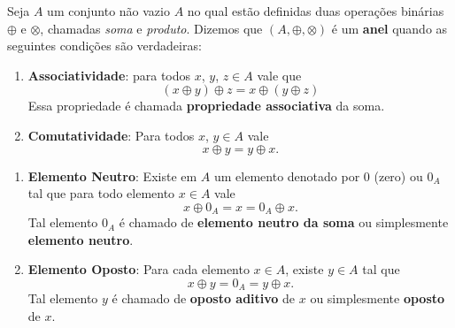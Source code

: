 \documentclass{beamer}
\begin{document}
    \begin{frame}
        \begin{definicao}
            Seja $A$ um conjunto n{\~a}o vazio $A$ no qual est\~ao definidas duas opera{\c c}{\~o}es bin\'arias $\oplus$ e $\otimes$, chamadas \textit{soma} e \textit{produto}.  Dizemos que $(A, \oplus, \otimes)$ {\'e} um \textbf{anel} quando as seguintes condi{\c c}{\~o}es s{\~a}o verdadeiras:
            \begin{enumerate}[label={\roman*})]
                \item \textbf{Associatividade}: para todos $x$, $y$, $z \in A$ vale que
                \[
                    (x \oplus y) \oplus z = x \oplus (y \oplus z)
                \]
                Essa propriedade {\'e} chamada \textbf{propriedade associativa} da soma.

                \vspace{.7cm}

                \item \textbf{Comutatividade}: Para todos $x$, $y \in A$ vale
                \[
                    x \oplus y = y \oplus x.
                \]

                \vspace{.7cm}

                \seti
            \end{enumerate}
        \end{definicao}
    \end{frame}

    \begin{frame}
        \begin{definicao}
            \begin{enumerate}[label={\roman*})]
                \conti

                \item \textbf{Elemento Neutro}: Existe em $A$ um elemento denotado por $0$ (zero) ou $0_{A}$ tal que para todo elemento $x \in A$ vale
                \[
                    x \oplus 0_A = x = 0_A \oplus x.
                \]
                Tal elemento $0_A$ \'e chamado de \textbf{elemento neutro da soma} ou simplesmente \textbf{elemento neutro}.

                \vspace{.7cm}

                \item \textbf{Elemento Oposto}: Para cada elemento $x \in A$, existe $y \in A$ tal que
                \[
                    x \oplus y = 0_A = y \oplus x.
                \]
                Tal elemento $y$ \'e chamado de \textbf{oposto aditivo} de $x$ ou simplesmente \textbf{oposto} de $x$.

                \vspace{.7cm}

                \seti
    \end{enumerate}
        \end{definicao}
    \end{frame}
\end{document}
